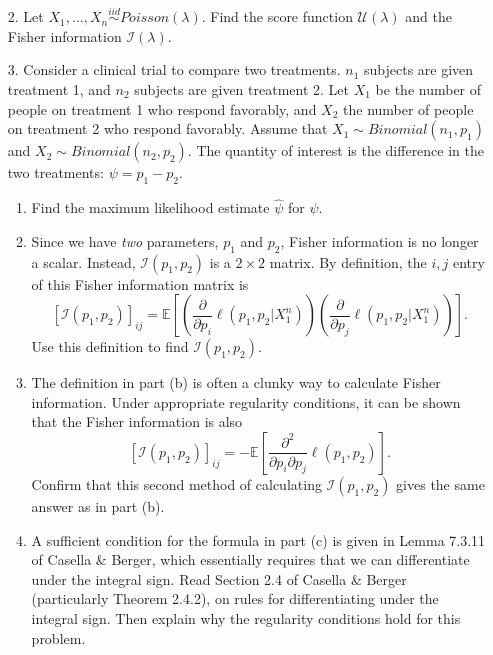 \documentclass[11pt]{article}
\begin{document}
\begin{enumerate}
\item[2.] Let $X_1,...,X_n \overset{iid}{\sim} Poisson(\lambda)$.  Find the score function $\mathcal{U}(\lambda)$ and the Fisher information $\mathcal{I}(\lambda)$.

\item[3.] Consider a clinical trial to compare two treatments. $n_1$ subjects are given treatment 1, and $n_2$ subjects are given treatment 2. Let $X_1$ be the number of people on treatment 1 who respond favorably, and $X_2$ the number of people on treatment 2 who respond favorably. Assume that $X_1 \sim Binomial(n_1, p_1)$ and $X_2 \sim Binomial(n_2, p_2)$. The quantity of interest is the difference in the two treatments: $\psi = p_1 - p_2$.

\begin{enumerate}
\item Find the maximum likelihood estimate $\widehat{\psi}$ for $\psi$.

\item Since we have \textit{two} parameters, $p_1$ and $p_2$, Fisher information is no longer a scalar. Instead, $\mathcal{I}(p_1, p_2)$ is a $2 \times 2$ matrix. By definition, the $i,j$ entry of this Fisher information matrix is
$$[\mathcal{I}(p_1, p_2)]_{ij} = \mathbb{E} \left[ \left(\frac{\partial}{\partial p_i} \ell(p_1, p_2 | X_1^n) \right) \left(\frac{\partial}{\partial p_j} \ell(p_1, p_2 | X_1^n) \right) \right]. $$
Use this definition to find $\mathcal{I}(p_1, p_2)$.

\item The definition in part (b) is often a clunky way to calculate Fisher information. Under appropriate regularity conditions, it can be shown that the Fisher information is also
$$[\mathcal{I}(p_1, p_2)]_{ij} = - \mathbb{E}\left[ \frac{\partial^2}{\partial p_i \partial p_j} \ell(p_1, p_2) \right].$$
Confirm that this second method of calculating $\mathcal{I}(p_1, p_2)$ gives the same answer as in part (b).

\item A sufficient condition for the formula in part (c) is given in Lemma 7.3.11 of Casella \& Berger, which essentially requires that we can differentiate under the integral sign. Read Section 2.4 of Casella \& Berger (particularly Theorem 2.4.2), on rules for differentiating under the integral sign. Then explain why the regularity conditions hold for this problem.
\end{enumerate}
\end{enumerate}
\end{document}
